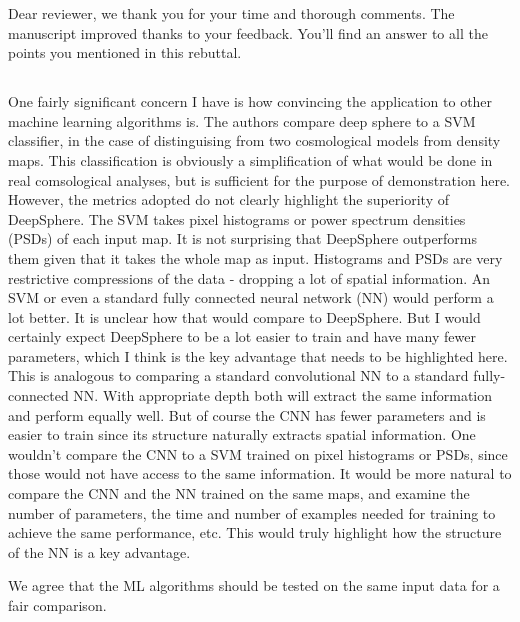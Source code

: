 \documentclass[12pt,a4paper]{article}
\newcommand{\1}{\b{1}}              %
\newcommand{\0}{\b{0}}              %
\begin{document}
Dear reviewer, we thank you for your time and thorough comments.
The manuscript improved thanks to your feedback.
You'll find an answer to all the points you mentioned in this rebuttal.

\subsection{}
\begin{mdframed}[style=comment]
One fairly significant concern I have is how convincing the application to other machine learning algorithms is. The authors compare deep sphere to a SVM classifier, in the case of distinguising from two cosmological models from density maps. This classification is obviously a simplification of what would be done in real comsological analyses, but is sufficient for the purpose of demonstration here. However, the metrics adopted do not clearly highlight the superiority of DeepSphere. The SVM takes pixel histograms or power spectrum densities (PSDs) of each input map. It is not surprising that DeepSphere outperforms them given that it takes the whole map as input. Histograms and PSDs are very restrictive compressions of the data - dropping a lot of spatial information. An SVM or even a standard fully connected neural network (NN) would perform a lot better. It is unclear how that would compare to DeepSphere. But I would certainly expect DeepSphere to be a lot easier to train and have many fewer parameters, which I think is the key advantage that needs to be highlighted here. This is analogous to comparing a standard convolutional NN to a standard fully-connected NN. With appropriate depth both will extract the same information and perform equally well. But of course the CNN has fewer parameters and is easier to train since its structure naturally extracts spatial information. One wouldn't compare the CNN to a SVM trained on pixel histograms or PSDs, since those would not have access to the same information. It would be more natural to compare the CNN and the NN trained on the same maps, and examine the number of parameters, the time and number of examples needed for training to achieve the same performance, etc. This would truly highlight how the structure of the NN is a key advantage.
\end{mdframed}

We agree that the ML algorithms should be tested on the same input data for a fair comparison.
\end{document}
